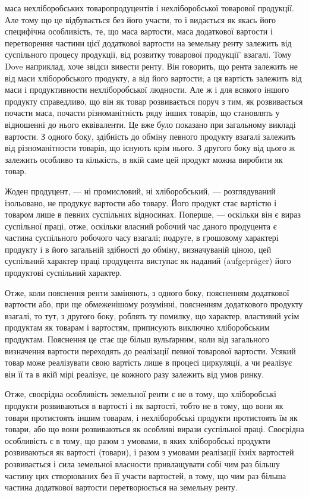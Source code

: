 \parcont{}  %
маса нехліборобських товаропродуцентів і нехліборобської товарової продукції.
Але тому що це відбувається без його участи, то і видається як якась його
специфічна особливість, те, що маса вартости, маса додаткової вартости і перетворення
частини цієї додаткової вартости на земельну ренту залежить від
суспільного процесу продукції, від розвитку товарової продукції' взагалі. Тому
Dove наприклад, хоче звідси вивести ренту. Він говорить, що рента залежить
не від маси хліборобського продукту, а від його вартости; а ця вартість залежить
від маси і продуктивности нехліборобської людности. Але ж і для всякого іншого
продукту справедливо, що він як товар розвивається поруч з тим, як розвивається
почасти маса, почасти різноманітність ряду інших товарів, що становлять у відношенні
до нього еквіваленти. Це вже було показано при загальному викладі
вартости. З одного боку, здібність до обміну певного продукту взагалі залежить
від різноманітности товарів, що існують крім нього. З другого боку від цього ж
залежить особливо та кількість, в якій саме цей продукт можна виробити як товар.

Жоден продуцент, — ні промисловий, ні хліборобський, — розглядуваний
ізольовано, не продукує вартости або товару. Його продукт стає вартістю і товаром
лише в певних суспільних відносинах. Поперше, — оскільки він є вираз суспільної
праці, отже, оскільки власний робочий час даного продуцента є частина суспільного
робочого часу взагалі; подруге, в грошовому характері продукту і в його загальній
здібності до обміну, визначуваній ціною, цей суспільний характер праці продуцента
виступає як наданий (aufgepräger) його продуктові суспільний характер.

Отже, коли пояснення ренти заміняють, з одного боку, поясненням додаткової
вартости або, при ще обмеженішому розумінні, поясненням додаткового
продукту взагалі, то тут, з другого боку, роблять ту помилку, що характер, властивий
усім продуктам як товарам і вартостям, приписують виключно хліборобським
продуктам. Пояснення це стає ще більш вульґарним, коли від загального визначення
вартости переходять до реалізації певної товарової вартости. Усякий товар
може реалізувати свою вартість лише в процесі циркуляції, а чи реалізує
він її та в якій мірі реалізує, це кожного разу залежить від умов ринку.

Отже, своєрідна особливість земельної ренти є не в тому, що хліборобські
продукти розвиваються в вартості і як вартості, тобто не в тому, що вони як
товари протистоять іншим товарам, і нехліборобські продукти протистоять їм як
товари, або що вони розвиваються як особливі вирази суспільної праці. Своєрідна
особливість є в тому, що разом з умовами, в яких хліборобські продукти
розвиваються як вартості (товари), і разом з умовами реалізації їхніх вартостей
розвивається і сила земельної власности привлащувати собі чим раз більшу
частину цих створюваних без її участи вартостей, в тому, що чим раз більша
частина додаткової вартости перетворюється на земельну ренту.

